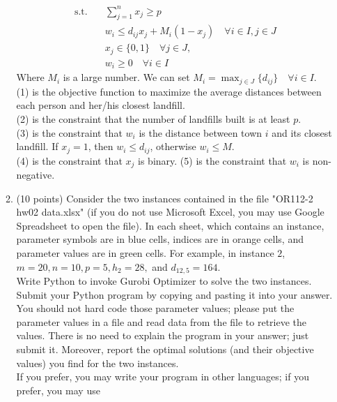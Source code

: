\documentclass[12pt]{article}
\begin{document}
\begin{enumerate}
\begin{enumerate}
\begin{align}
                              \text{s.t.}\quad & \sum_{j=1}^n x_j \geq p                                       \\
                                               & w_i \leq d_{ij}x_j + M_i(1-x_j) \quad \forall i \in I, j\in J \\
                                               & x_j \in \{0,1\} \quad \forall j \in J,                        \\
                                               & w_i \geq 0 \quad \forall i \in I
                        \end{align}
                        Where $M_i$ is a large number. We can set $M_i = \max_{j\in J}\{d_{ij}\}\quad \forall i \in I$.\\
                        (1) is the objective function to maximize the average distances between each person and her/his closest landfill.\\
                        (2) is the constraint that the number of landfills built is at least $p$.\\
                        (3) is the constraint that
                        $w_i$ is the distance between town $i$ and its closest landfill. If $x_j = 1$, then $w_i \leq d_{ij}$, otherwise $w_i \leq M$.\\
                        (4) is the constraint that $x_j$ is binary.
                        (5) is the constraint that $w_i$ is non-negative.
                  \item (10 points) Consider the two instances contained in the file "OR112-2 hw02 data.xlsx" (if you do not use Microsoft Excel, you may use Google Spreadsheet to open the file). In each sheet, which contains an instance, parameter symbols are in blue cells, indices are in orange cells, and parameter values are in green cells. For example, in instance $2$, $m = 20, n = 10, p = 5, h_2 = 28,$ and $d_{12,5} = 164$.\\
                        Write Python to invoke Gurobi Optimizer to solve the two instances. Submit your Python
                        program by copying and pasting it into your answer. You should not hard code those parameter values; please put the parameter values in a file and read data from the file to retrieve
                        the values. There is no need to explain the program in your answer; just submit it. Moreover,
                        report the optimal solutions (and their objective values) you find for the two instances.\\
                        If you prefer, you may write your program in other languages; if you prefer, you may use

\end{enumerate}
\end{enumerate}
\end{document}
